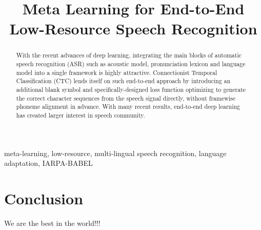 \documentclass{article}
\title{Meta Learning for End-to-End Low-Resource Speech Recognition}
\begin{document}
%
\maketitle
%
\begin{abstract}
  With the recent advances of deep learning, integrating the main blocks of automatic speech recognition (ASR) such as acoustic model, pronunciation lexicon and language model into a single framework is highly attractive. Connectionist Temporal Classification (CTC) lends itself on such end-to-end approach by introducing an additional blank symbol and specifically-designed loss function optimizing to generate the correct character sequences from the speech signal directly, without framewise phoneme alignment in advance. With many recent results, end-to-end deep learning has created larger interest in speech community.
\end{abstract}
%
\begin{keywords}
  meta-learning, low-resource, multi-lingual speech recognition, language adaptation, IARPA-BABEL
\end{keywords}
%










\section{Conclusion}
\label{sec:conclusion}

We are the best in the world!!!







\newpage

\end{document}
